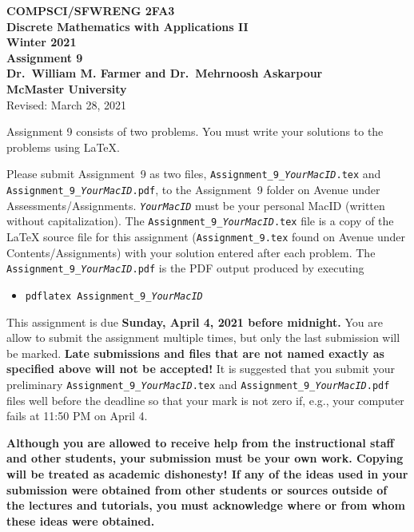 \documentclass[11pt,fleqn]{article}
\begin{document}
\begin{center}

{\large \textbf{COMPSCI/SFWRENG 2FA3}}\\[2mm]
{\large \textbf{Discrete Mathematics with Applications II}}\\[2mm]
{\large \textbf{Winter 2021}}\\[8mm]
{\huge \textbf{Assignment 9}}\\[6mm]
{\large \textbf{Dr.~William M. Farmer and Dr.~Mehrnoosh Askarpour}}\\[2mm]
{\large \textbf{McMaster University}}\\[6mm]
{\large Revised: March 28, 2021}

\end{center}

\medskip

Assignment 9 consists of two problems.  You must write your solutions
to the problems using LaTeX.

Please submit Assignment~9 as two files,
\texttt{Assignment\_9\_\emph{YourMacID}.tex} and
\texttt{Assignment\_9\_\emph{YourMacID}.pdf}, to the Assignment~9
folder on Avenue under Assessments/Assignments.
\texttt{\emph{YourMacID}} must be your personal MacID (written without
capitalization).  The \texttt{Assignment\_9\_\emph{YourMacID}.tex}
file is a copy of the LaTeX source file for this assignment
(\texttt{Assignment\_9.tex} found on Avenue under
Contents/Assignments) with your solution entered after each problem.
The \texttt{Assignment\_9\_\emph{YourMacID}.pdf} is the PDF output
produced by executing

\begin{itemize}

  \item[] \texttt{pdflatex Assignment\_9\_\emph{YourMacID}}

\end{itemize}

This assignment is due \textbf{Sunday, April 4, 2021 before
  midnight.}  You are allow to submit the assignment multiple times,
but only the last submission will be marked.  \textbf{Late submissions
  and files that are not named exactly as specified above will not be
  accepted!}  It is suggested that you submit your preliminary
\texttt{Assignment\_9\_\emph{YourMacID}.tex} and
\texttt{Assignment\_9\_\emph{YourMacID}.pdf} files well before the
deadline so that your mark is not zero if, e.g., your computer fails
at 11:50 PM on April 4.

\textbf{Although you are allowed to receive help from the
  instructional staff and other students, your submission must be your
  own work.  Copying will be treated as academic dishonesty! If any of
  the ideas used in your submission were obtained from other students
  or sources outside of the lectures and tutorials, you must
  acknowledge where or from whom these ideas were obtained.}
\end{document}
